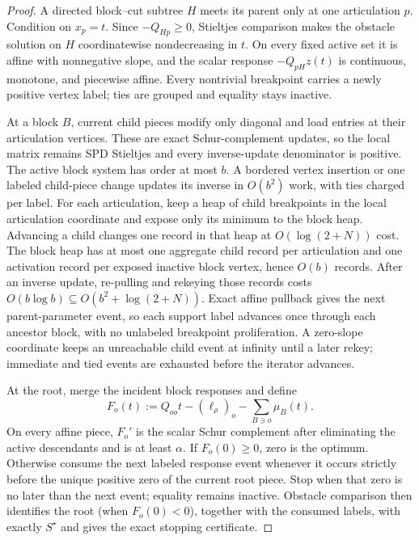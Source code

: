 \begin{proof}
A directed block--cut subtree $H$ meets its parent only at one articulation
$p$.  Condition on $x_p=t$.  Since $-Q_{Hp}\geq0$, Stieltjes comparison makes
the obstacle solution on $H$ coordinatewise nondecreasing in $t$.  On every
fixed active set it is affine with nonnegative slope, and the scalar response
$-Q_{pH}z(t)$ is continuous, monotone, and piecewise affine.  Every
nontrivial breakpoint carries a newly positive vertex label; ties are grouped
and equality stays inactive.

At a block $B$, current child pieces modify only diagonal and load entries at
their articulation vertices.  These are exact Schur-complement updates, so
the local matrix remains SPD Stieltjes and every inverse-update denominator
is positive.  The active block system has order at most $b$.  A bordered
vertex insertion or one labeled child-piece change updates its inverse in
$O(b^2)$ work, with ties charged per label.  For each articulation, keep a
heap of child breakpoints in the local articulation coordinate and expose
only its minimum to the block heap.  Advancing a child changes one record in
that heap at $O(\log(2+N))$ cost.  The block heap has at most one aggregate
child record per articulation and one activation record per exposed inactive
block vertex, hence $O(b)$ records.  After an inverse update, re-pulling and
rekeying those records costs
$O(b\log b)\subseteq O(b^2+\log(2+N))$.  Exact affine pullback gives the next
parent-parameter event, so each support label advances once through each
ancestor block, with no unlabeled breakpoint proliferation.  A zero-slope
coordinate keeps an unreachable child event at infinity until a later rekey;
immediate and tied events are exhausted before the iterator advances.

At the root, merge the incident block responses and define
\begin{equation*}
 F_o(t):=Q_{oo}t-(\ell_\rho)_o-
         \sum_{B\ni o}\mu_B(t).
\end{equation*}
On every affine piece, $F_o'$ is the scalar Schur complement after eliminating
the active descendants and is at least $\alpha$.  If $F_o(0)\geq0$, zero is
the optimum.  Otherwise consume the next labeled response event whenever it
occurs strictly before the unique positive zero of the current root piece.
Stop when that zero is no later than the next event; equality remains
inactive.  Obstacle comparison then identifies the root (when
$F_o(0)<0$), together with the consumed labels, with exactly $S^\star$ and
gives the exact stopping certificate.


\end{proof}
